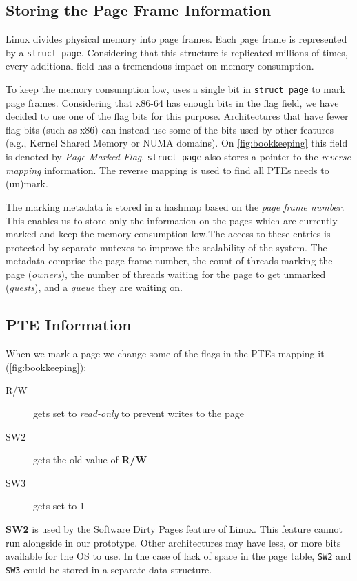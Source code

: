 \subsection{Storing the Page Frame Information}
\label{subsec:frameinfo}
Linux divides physical memory into page frames. Each page frame is represented
by a \texttt{struct page}. Considering that this structure is replicated
millions of times, every additional field has a tremendous impact on memory
consumption.

To keep the memory consumption low, \sysname uses a single bit in \texttt{struct
page} to mark page frames. Considering that x86-64 has enough bits in the flag
field, we have decided to use one of the flag bits for this purpose.
Architectures that have fewer flag bits (such as x86) can instead use some of
the bits used by other features (e.g., Kernel Shared Memory or NUMA domains). On
\autoref{fig:bookkeeping} this field is denoted by \emph{Page Marked Flag}.
\texttt{struct page} also stores a pointer to the \emph{reverse mapping}
information. The reverse mapping is used to find all PTEs \sysname needs to
(un)mark.

The marking metadata is stored in a hashmap based on the \emph{page frame
number}. This enables us to store only the information on the pages which are
currently marked and keep the memory consumption low.The access to these entries
is protected by separate mutexes to improve the scalability of the system. The
metadata comprise the page frame number, the count of threads marking the page
(\emph{owners}), the number of threads waiting for the page to get unmarked
(\emph{guests}), and a \emph{queue} they are waiting on. 

\subsection{PTE Information}
\label{subsec:pageinfo}

When we mark a page we change some of the flags in the PTEs mapping it
(\autoref{fig:bookkeeping}):

\begin{description}
  \item[R/W] gets set to \emph{read-only} to prevent writes to the page
  \item[SW2] gets the old value of \textbf{R/W}
  \item[SW3] gets set to 1 
\end{description}

\textbf{SW2} is used by the Software Dirty Pages
feature of Linux. This feature cannot run alongside \sysname in our prototype.
Other architectures may have less, or more bits available for the OS to use. In
the case of lack of space in the page table, \texttt{SW2} and \texttt{SW3} could
be stored in a separate data structure.

